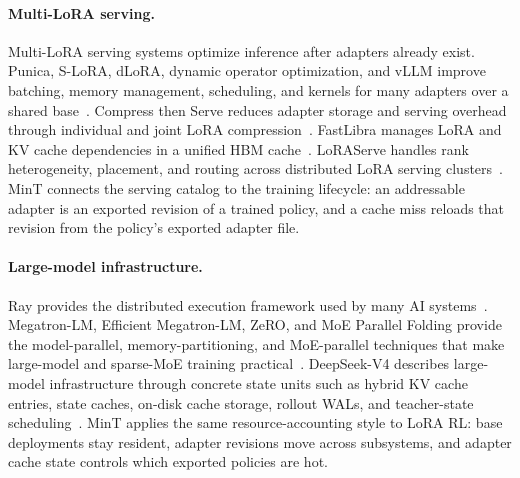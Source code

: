 \paragraph{Multi-LoRA serving.}
Multi-LoRA serving systems optimize inference after adapters already exist. Punica, S-LoRA, dLoRA, dynamic operator optimization, and vLLM improve batching, memory management, scheduling, and kernels for many adapters over a shared base~\citep{punica2024,slora2023,dlora2024,zhou2025dynamic,vllm2023}. Compress then Serve reduces adapter storage and serving overhead through individual and joint LoRA compression~\citep{compress_then_serve2024}. FastLibra manages LoRA and KV cache dependencies in a unified HBM cache~\citep{fastlibra2025}. LoRAServe handles rank heterogeneity, placement, and routing across distributed LoRA serving clusters~\citep{loraserve2025}. MinT connects the serving catalog to the training lifecycle: an addressable adapter is an exported revision of a trained policy, and a cache miss reloads that revision from the policy's exported adapter file.

\paragraph{Large-model infrastructure.}
Ray provides the distributed execution framework used by many AI systems~\citep{ray2018}. Megatron-LM, Efficient Megatron-LM, ZeRO, and MoE Parallel Folding provide the model-parallel, memory-partitioning, and MoE-parallel techniques that make large-model and sparse-MoE training practical~\citep{megatronlm2019,efficient_megatronlm2021,zero2019,moe_parallel_folding2026}. DeepSeek-V4 describes large-model infrastructure through concrete state units such as hybrid KV cache entries, state caches, on-disk cache storage, rollout WALs, and teacher-state scheduling~\citep{deepseekv4_2026}. MinT applies the same resource-accounting style to LoRA RL: base deployments stay resident, adapter revisions move across subsystems, and adapter cache state controls which exported policies are hot.
